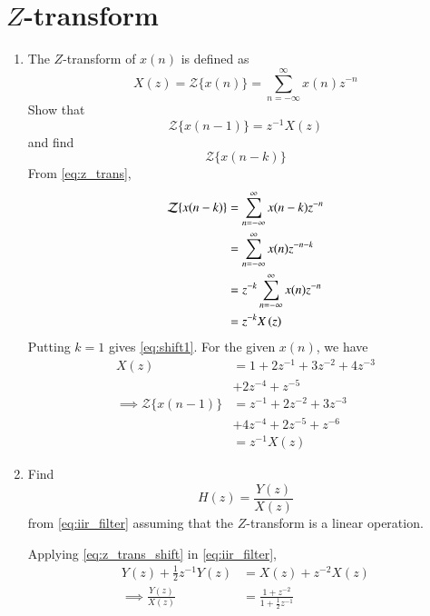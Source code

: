 \documentclass[journal,12pt,twocolumn]{IEEEtran}
\renewcommand\thesection{\arabic{section}}
\begin{document}
\section{$Z$-transform}
\begin{enumerate}[label=\thesection.\arabic*]
\item The $Z$-transform of $x(n)$ is defined as
\begin{equation}
\label{eq:z_trans}
X(z)={\mathcal {Z}}\{x(n)\}=\sum _{n=-\infty }^{\infty }x(n)z^{-n}
\end{equation}
Show that
\begin{equation}
\label{eq:shift1}
{\mathcal {Z}}\{x(n-1)\} = z^{-1}X(z)
\end{equation}
and find
\begin{equation}
	{\mathcal {Z}}\{x(n-k)\} 
\end{equation}
\solution From \eqref{eq:z_trans},
\begin{align}
{\mathcal {Z}}\{x(n-k)\} &=\sum _{n=-\infty }^{\infty }x(n-k)z^{-n}\\
&=\sum _{n=-\infty }^{\infty }x(n)z^{-n-k} \\
&= z^{-k}\sum _{n=-\infty }^{\infty }x(n)z^{-n} \\
&= z^{-k}X\left(z\right)
\label{eq:z_trans_shift}
\end{align}
Putting $k = 1$ gives \eqref{eq:shift1}. For the given $x(n)$, we have
\begin{align}
	X(z) &= 1 + 2z^{-1} + 3z^{-2} + 4z^{-3} \nonumber \\
		&+ 2z^{-4} + z^{-5} \\
	\implies {\mathcal {Z}}\{x(n-1)\} &= z^{-1} + 2z^{-2} + 3z^{-3} \nonumber \\
									  &+4z^{-4} + 2z^{-5} + z^{-6} \\
	&= z^{-1}X(z)
\end{align}	
\item Find
\begin{equation}
H(z) = \frac{Y(z)}{X(z)}
\end{equation}
from  \eqref{eq:iir_filter} assuming that the $Z$-transform is a linear operation.

\solution  Applying \eqref{eq:z_trans_shift} in \eqref{eq:iir_filter},
\begin{align}
Y(z) + \frac{1}{2}z^{-1}Y(z) &= X(z)+z^{-2}X(z) \\
\implies \frac{Y(z)}{X(z)} &= \frac{1 + z^{-2}}{1 + \frac{1}{2}z^{-1}}
\label{eq:freq_resp}
\end{align}


\end{enumerate}
\end{document}
